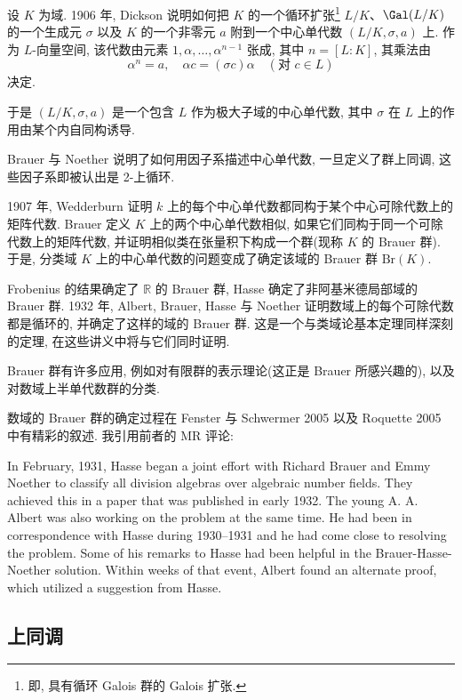 设 $K$ 为域. 1906 年, Dickson 说明如何把 $K$ 的一个循环扩张\footnote{即, 具有循环 Galois 群的 Galois 扩张.} $L/K$、$\Gal(L/K)$ 的一个生成元 $\sigma$ 以及 $K$ 的一个非零元 $a$ 附到一个中心单代数 $(L/K, \sigma, a)$ 上. 作为 $L$-向量空间, 该代数由元素 $1, \alpha, \ldots, \alpha^{n-1}$ 张成, 其中 $n = [L:K]$, 其乘法由
\[
\alpha^{n} = a, \quad \alpha c = (\sigma c)\alpha \quad (\text{对 } c \in L)
\]
决定.

于是 $(L/K, \sigma, a)$ 是一个包含 $L$ 作为极大子域的中心单代数, 其中 $\sigma$ 在 $L$ 上的作用由某个内自同构诱导.

Brauer 与 Noether 说明了如何用因子系描述中心单代数, 一旦定义了群上同调, 这些因子系即被认出是 2-上循环.

1907 年, Wedderburn 证明 $k$ 上的每个中心单代数都同构于某个中心可除代数上的矩阵代数. Brauer 定义 $K$ 上的两个中心单代数相似, 如果它们同构于同一个可除代数上的矩阵代数, 并证明相似类在张量积下构成一个群(现称 $K$ 的 Brauer 群). 于是, 分类域 $K$ 上的中心单代数的问题变成了确定该域的 Brauer 群 $\mathrm{Br}(K)$.

Frobenius 的结果确定了 $\mathbb{R}$ 的 Brauer 群, Hasse 确定了非阿基米德局部域的 Brauer 群. 1932 年, Albert, Brauer, Hasse 与 Noether 证明数域上的每个可除代数都是循环的, 并确定了这样的域的 Brauer 群. 这是一个与类域论基本定理同样深刻的定理, 在这些讲义中将与它们同时证明.

Brauer 群有许多应用, 例如对有限群的表示理论(这正是 Brauer 所感兴趣的), 以及对数域上半单代数群的分类.

\begin{NOTES}
数域的 Brauer 群的确定过程在 Fenster 与 Schwermer 2005\cite{FensterSchwermer2005} 以及 Roquette 2005\cite{Roquette2005} 中有精彩的叙述. 我引用前者的 MR 评论:

In February, 1931, Hasse began a joint effort with Richard Brauer and Emmy Noether to classify all division algebras over algebraic number fields. They achieved this in a paper that was published in early 1932. The young A. A. Albert was also working on the problem at the same time. He had been in correspondence with Hasse during 1930–1931 and he had come close to resolving the problem. Some of his remarks to Hasse had been helpful in the Brauer-Hasse-Noether solution. Within weeks of that event, Albert found an alternate proof, which utilized a suggestion from Hasse.
\end{NOTES}

\subsection*{上同调}

